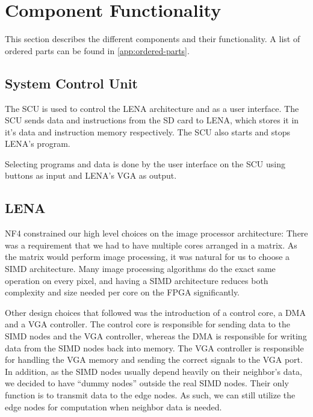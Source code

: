\section{Component Functionality}

This section describes the different components and their functionality. A list
of ordered parts can be found in \ref{app:ordered-parts}.

\subsection{System Control Unit}

The \acf{SCU} is used to control the \ac{LENA} architecture and as a user interface.
The SCU sends data and instructions from the \ac{SD} card to \ac{LENA}, which stores
it in it's data and instruction memory respectively. The \ac{SCU} also starts and stops \ac{LENA}'s program.

Selecting programs and data is done by the user interface on the \ac{SCU} using buttons as input
and \ac{LENA}'s VGA as output. 

\subsection{LENA}

NF4 constrained our high level choices on the image processor architecture:
There was a requirement that we had to have multiple cores arranged in a
matrix. As the matrix would perform image processing, it was natural for us to
choose a \ac{SIMD} architecture. Many image processing algorithms do the exact
same operation on every pixel, and having a \ac{SIMD} architecture reduces both
complexity and size needed per core on the \ac{FPGA} significantly.

Other design choices that followed was the introduction of a control core, a
\ac{DMA} and a \ac{VGA} controller. The control core is responsible for sending
data to the \ac{SIMD} nodes and the \ac{VGA} controller, whereas the \ac{DMA} is
responsible for writing data from the \ac{SIMD} nodes back into memory. The
\ac{VGA} controller is responsible for handling the \ac{VGA} memory and sending
the correct signals to the \ac{VGA} port. In addition, as the \ac{SIMD} nodes
usually depend heavily on their neighbor's data, we decided to have ``dummy
nodes'' outside the real \ac{SIMD} nodes. Their only function is to transmit
data to the edge nodes. As such, we can still utilize the edge nodes for
computation when neighbor data is needed.

